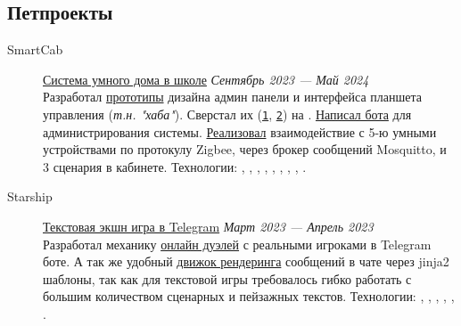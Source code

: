 \documentclass[margin,line]{resume}
\begin{document}
\begin{resume}
  \section{\mysidestyle Петпроекты}\vspace{2mm}

  \begin{description}

    \item[SmartCab]\small{\href{https://github.com/smart-cab}{Система
        умного дома в школе} \hfill
      \textsl{Сентябрь 2023 — Май 2024\vspace{1mm}}}\\
      Разработал
      \href{https://www.figma.com/design/8H1tFpxgmIDV1xp06ndi73/SmartCab?node-id=0-1&p=f}{прототипы}
      дизайна админ панели и интерфейса планшета управления
      (\textit{т.н. "хаба"}). Сверстал их
      (\texttt{\href{https://github.com/smart-cab/smartcab-hub/tree/main/frontend/src}{1}},
      \texttt{\href{https://github.com/smart-cab/smartcab-dashboard/tree/main/frontend/src}{2}})
      на .
      \href{https://github.com/smart-cab/smartcab-bot}{Написал бота}
      для администрирования системы.
      \href{https://github.com/smart-cab/smartcab-hub/blob/main/backend/smartcab/interface/mqtt.py}{Реализовал}
      взаимодействие с 5-ю умными устройствами по протокулу Zigbee, через
      брокер сообщений Mosquitto, и 3 сценария в кабинете.
      Технологии:
      , ,
      , ,
      ,
      , ,
      , .
      \vspace{3mm}

    \item[Starship]\small{\href{https://github.com/starship-crew}{Текстовая
        экшн игра в Telegram}
      \hfill \textsl{Март 2023 — Апрель 2023\vspace{1mm}}}\\
      Разработал механику
      \href{https://github.com/starship-crew/telegram-client/blob/main/app/handlers/fight.py}{онлайн
      дуэлей} с реальными игроками в Telegram боте. А
      так же удобный
      \href{https://github.com/starship-crew/telegram-client/blob/main/app/template.py}{движок
      рендеринга}
      сообщений в чате через jinja2 шаблоны, так как для текстовой игры
      требовалось гибко работать с большим количеством сценарных и
      пейзажных текстов.
      Технологии:
      , ,
      ,
      , ,
      .


\end{description}
\end{resume}
\end{document}

